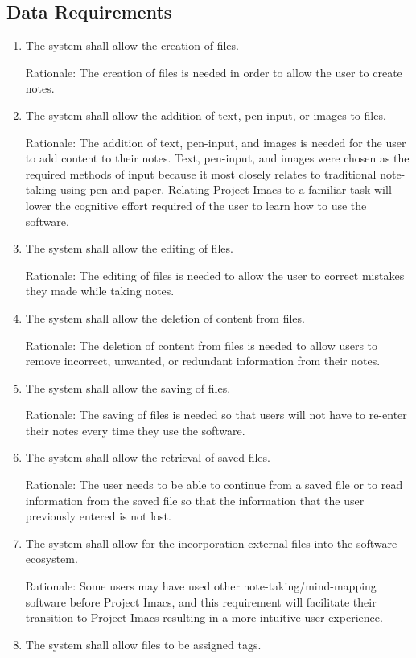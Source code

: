 \documentclass{article}
\begin{document}
\subsection{Data Requirements}
\begin{enumerate}[DR1]
\item The system shall allow the creation of files.

Rationale: The creation of files is needed in order to allow the user to create notes.
\item The system shall allow the addition of text, pen-input, or images to files.

Rationale: The addition of text, pen-input, and images is needed for the user to add content to their notes. Text, pen-input, and images were chosen as the required methods of input because it most closely relates to traditional note-taking using pen and paper. Relating Project Imacs to a familiar task will lower the cognitive effort required of the user to learn how to use the software.
\item The system shall allow the editing of files.

Rationale: The editing of files is needed to allow the user to correct mistakes they made while taking notes.
\item The system shall allow the deletion of content from files.

Rationale: The deletion of content from files is needed to allow users to remove incorrect, unwanted, or redundant information from their notes.
\item The system shall allow the saving of files.

Rationale: The saving of files is needed so that users will not have to re-enter their notes every time they use the software.
\item The system shall allow the retrieval of saved files.

Rationale: The user needs to be able to continue from a saved file or to read information from the saved file so that the information that the user previously entered is not lost.
\item The system shall allow for the incorporation external files into the software ecosystem.

Rationale: Some users may have used other note-taking/mind-mapping software before Project Imacs, and this requirement will facilitate their transition to Project Imacs resulting in a more intuitive user experience.
\item The system shall allow files to be assigned tags.


\end{enumerate}
\end{document}
